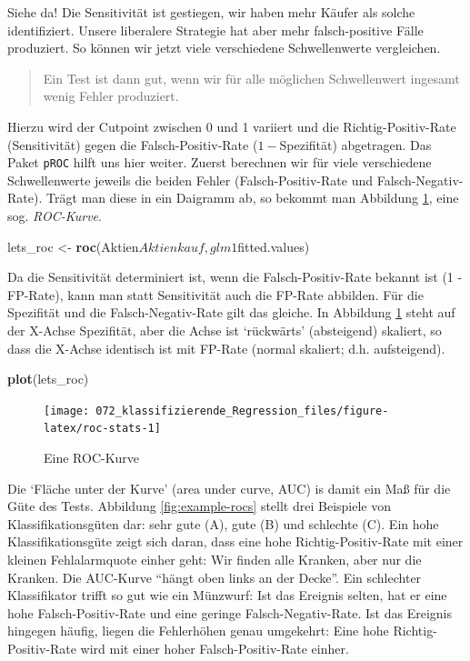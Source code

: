 \documentclass[12pt,ngerman,]{book}
\makeatletter
\newenvironment{Shaded}{\begin{snugshade}}{\end{snugshade}}
\newcommand{\KeywordTok}[1]{\textcolor[rgb]{0.13,0.29,0.53}{\textbf{{#1}}}}
\newcommand{\StringTok}[1]{\textcolor[rgb]{0.31,0.60,0.02}{{#1}}}
\newcommand{\NormalTok}[1]{{#1}}
\newenvironment{kframe}{%
\medskip{}
\setlength{\fboxsep}{.8em}
 \def\at@end@of@kframe{}%
 \ifinner\ifhmode%
  \def\at@end@of@kframe{\end{minipage}}%
  \begin{minipage}{\columnwidth}%
 \fi\fi%
 \def\FrameCommand##1{\hskip\@totalleftmargin \hskip-\fboxsep
 \colorbox{shadecolor}{##1}\hskip-\fboxsep
     \hskip-\linewidth \hskip-\@totalleftmargin \hskip\columnwidth}%
 \MakeFramed {\advance\hsize-\width
   \@totalleftmargin\z@ \linewidth\hsize
   \@setminipage}}%
 {\par\unskip\endMakeFramed%
 \at@end@of@kframe}
\renewenvironment{Shaded}{\begin{kframe}}{\end{kframe}}
\theoremstyle{definition}
\theoremstyle{definition}
\theoremstyle{remark}
\makeatother
\begin{document}
Siehe da! Die Sensitivität ist gestiegen, wir haben mehr Käufer als
solche identifiziert. Unsere liberalere Strategie hat aber mehr
falsch-positive Fälle produziert. So können wir jetzt viele verschiedene
Schwellenwerte vergleichen.

\begin{quote}
Ein Test ist dann gut, wenn wir für alle möglichen Schwellenwert
ingesamt wenig Fehler produziert.
\end{quote}

Hierzu wird der Cutpoint zwischen 0 und 1 variiert und die
Richtig-Positiv-Rate (Sensitivität) gegen die Falsch-Positiv-Rate
(\(1-\)Spezifität) abgetragen. Das Paket \texttt{pROC} hilft uns hier
weiter. Zuerst berechnen wir für viele verschiedene Schwellenwerte
jeweils die beiden Fehler (Falsch-Positiv-Rate und Falsch-Negativ-Rate).
Trägt man diese in ein Daigramm ab, so bekommt man Abbildung
\ref{fig:roc-stats}, eine sog. \emph{ROC-Kurve}.

\begin{Shaded}
\begin{Highlighting}[]
\NormalTok{lets_roc <-}\StringTok{ }\KeywordTok{roc}\NormalTok{(Aktien$Aktienkauf, glm1$fitted.values)}
\end{Highlighting}
\end{Shaded}

Da die Sensitivität determiniert ist, wenn die Falsch-Positiv-Rate
bekannt ist (1 - FP-Rate), kann man statt Sensitivität auch die FP-Rate
abbilden. Für die Spezifität und die Falsch-Negativ-Rate gilt das
gleiche. In Abbildung \ref{fig:roc-stats} steht auf der X-Achse
Spezifität, aber die Achse ist `rückwärts' (absteigend) skaliert, so
dass die X-Achse identisch ist mit FP-Rate (normal skaliert; d.h.
aufsteigend).

\begin{Shaded}
\begin{Highlighting}[]
\KeywordTok{plot}\NormalTok{(lets_roc)}
\end{Highlighting}
\end{Shaded}

\begin{figure}

{\centering \texttt{[image: 072\_klassifizierende\_Regression\_files/figure-latex/roc-stats-1]} 

}

\caption{Eine ROC-Kurve}\label{fig:roc-stats}
\end{figure}

Die `Fläche unter der Kurve' (area under curve, AUC) is damit ein Maß
für die Güte des Tests. Abbildung \ref{fig:example-rocs} stellt drei
Beispiele von Klassifikationsgüten dar: sehr gute (A), gute (B) und
schlechte (C). Ein hohe Klassifikationsgüte zeigt sich daran, dass eine
hohe Richtig-Positiv-Rate mit einer kleinen Fehlalarmquote einher geht:
Wir finden alle Kranken, aber nur die Kranken. Die AUC-Kurve ``hängt
oben links an der Decke''. Ein schlechter Klassifikator trifft so gut
wie ein Münzwurf: Ist das Ereignis selten, hat er eine hohe
Falsch-Positiv-Rate und eine geringe Falsch-Negativ-Rate. Ist das
Ereignis hingegen häufig, liegen die Fehlerhöhen genau umgekehrt: Eine
hohe Richtig-Positiv-Rate wird mit einer hoher Falsch-Positiv-Rate
einher.
\end{document}

